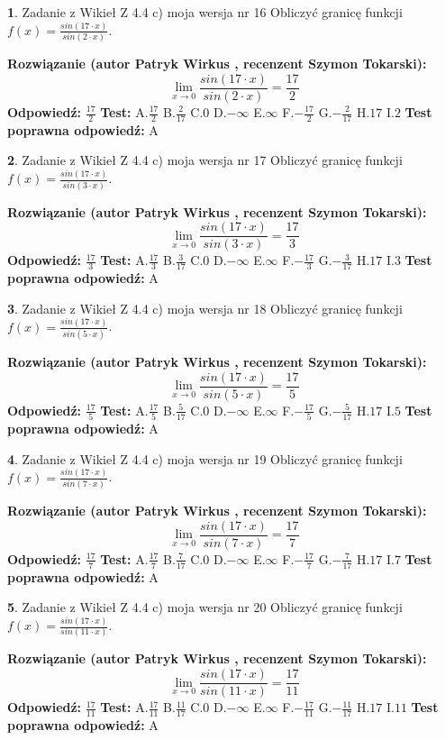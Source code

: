 \documentclass[12pt, a4paper]{article}
\theoremstyle{definition} %
\newtheorem{zad}{}
\newcommand{\zadStart}[1]{\begin{zad}#1\newline}
\newcommand{\zadStop}{\end{zad}}
\newcommand{\rozwStart}[2]{\noindent \textbf{Rozwiązanie (autor #1 , recenzent #2): }\newline}
\newcommand{\rozwStop}{\newline}
\newcommand{\odpStart}{\noindent \textbf{Odpowiedź:}\newline}
\newcommand{\odpStop}{\newline}
\newcommand{\testStart}{\noindent \textbf{Test:}\newline}
\newcommand{\testStop}{\newline}
\newcommand{\kluczStart}{\noindent \textbf{Test poprawna odpowiedź:}\newline}
\newcommand{\kluczStop}{\newline}
\begin{document}
\zadStart{Zadanie z Wikieł Z 4.4 c) moja wersja nr 16}
Obliczyć granicę funkcji $f(x)=\frac{sin(17\cdot x)}{sin(2\cdot x)}$.
\zadStop
\rozwStart{Patryk Wirkus}{Szymon Tokarski}
$$\lim\limits_{x\to 0}\frac{sin(17\cdot x)}{sin(2\cdot x)}=
\frac{17}{2}$$
\rozwStop
\odpStart
$\frac{17}{2}$
\odpStop
\testStart
A.$\frac{17}{2}$
B.$\frac{2}{17}$
C.$0$
D.$-\infty$
E.$\infty$
F.$-\frac{17}{2}$
G.$-\frac{2}{17}$
H.$17$
I.$2$
\testStop
\kluczStart
A
\kluczStop



\zadStart{Zadanie z Wikieł Z 4.4 c) moja wersja nr 17}
Obliczyć granicę funkcji $f(x)=\frac{sin(17\cdot x)}{sin(3\cdot x)}$.
\zadStop
\rozwStart{Patryk Wirkus}{Szymon Tokarski}
$$\lim\limits_{x\to 0}\frac{sin(17\cdot x)}{sin(3\cdot x)}=
\frac{17}{3}$$
\rozwStop
\odpStart
$\frac{17}{3}$
\odpStop
\testStart
A.$\frac{17}{3}$
B.$\frac{3}{17}$
C.$0$
D.$-\infty$
E.$\infty$
F.$-\frac{17}{3}$
G.$-\frac{3}{17}$
H.$17$
I.$3$
\testStop
\kluczStart
A
\kluczStop



\zadStart{Zadanie z Wikieł Z 4.4 c) moja wersja nr 18}
Obliczyć granicę funkcji $f(x)=\frac{sin(17\cdot x)}{sin(5\cdot x)}$.
\zadStop
\rozwStart{Patryk Wirkus}{Szymon Tokarski}
$$\lim\limits_{x\to 0}\frac{sin(17\cdot x)}{sin(5\cdot x)}=
\frac{17}{5}$$
\rozwStop
\odpStart
$\frac{17}{5}$
\odpStop
\testStart
A.$\frac{17}{5}$
B.$\frac{5}{17}$
C.$0$
D.$-\infty$
E.$\infty$
F.$-\frac{17}{5}$
G.$-\frac{5}{17}$
H.$17$
I.$5$
\testStop
\kluczStart
A
\kluczStop



\zadStart{Zadanie z Wikieł Z 4.4 c) moja wersja nr 19}
Obliczyć granicę funkcji $f(x)=\frac{sin(17\cdot x)}{sin(7\cdot x)}$.
\zadStop
\rozwStart{Patryk Wirkus}{Szymon Tokarski}
$$\lim\limits_{x\to 0}\frac{sin(17\cdot x)}{sin(7\cdot x)}=
\frac{17}{7}$$
\rozwStop
\odpStart
$\frac{17}{7}$
\odpStop
\testStart
A.$\frac{17}{7}$
B.$\frac{7}{17}$
C.$0$
D.$-\infty$
E.$\infty$
F.$-\frac{17}{7}$
G.$-\frac{7}{17}$
H.$17$
I.$7$
\testStop
\kluczStart
A
\kluczStop



\zadStart{Zadanie z Wikieł Z 4.4 c) moja wersja nr 20}
Obliczyć granicę funkcji $f(x)=\frac{sin(17\cdot x)}{sin(11\cdot x)}$.
\zadStop
\rozwStart{Patryk Wirkus}{Szymon Tokarski}
$$\lim\limits_{x\to 0}\frac{sin(17\cdot x)}{sin(11\cdot x)}=
\frac{17}{11}$$
\rozwStop
\odpStart
$\frac{17}{11}$
\odpStop
\testStart
A.$\frac{17}{11}$
B.$\frac{11}{17}$
C.$0$
D.$-\infty$
E.$\infty$
F.$-\frac{17}{11}$
G.$-\frac{11}{17}$
H.$17$
I.$11$
\testStop
\kluczStart
A
\kluczStop
\end{document}
